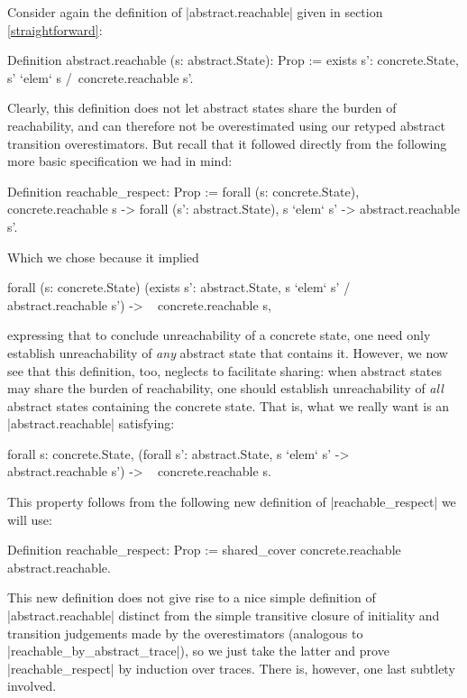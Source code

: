 \documentclass[runningheads]{llncs}
\begin{document}
Consider again the definition of |abstract.reachable| given in section \ref{straightforward}:
\begin{code}
Definition abstract.reachable (s: abstract.State): Prop
  := exists s': concrete.State, s' `elem` s /\ concrete.reachable s'.
\end{code}
Clearly, this definition does not let abstract states share the burden of reachability, and can therefore not be overestimated using our retyped abstract transition overestimators. But recall that it followed directly from the following more basic specification we had in mind:
\begin{code}
Definition reachable_respect: Prop :=
  forall (s: concrete.State), concrete.reachable s ->
    forall (s': abstract.State), s `elem` s' -> abstract.reachable s'.
\end{code}
Which we chose because it implied
\begin{code}
forall (s: concrete.State)
  (exists s': abstract.State, s `elem` s' /\ ~ abstract.reachable s') ->
    ~ concrete.reachable s,
\end{code}
expressing that to conclude unreachability of a concrete state, one need only establish unreachability of \emph{any} abstract state that contains it. However, we now see that this definition, too, neglects to facilitate sharing: when abstract states may share the burden of reachability, one should establish unreachability of \emph{all} abstract states containing the concrete state. That is, what we really want is an |abstract.reachable| satisfying:
\begin{code}
forall s: concrete.State,
  (forall s': abstract.State, s `elem` s' -> ~ abstract.reachable s') ->
  ~ concrete.reachable s.
\end{code}
This property follows from the following new definition of |reachable_respect| we will use:
\begin{code}
Definition reachable_respect: Prop :=
  shared_cover concrete.reachable abstract.reachable.
\end{code}
This new definition does not give rise to a nice simple definition of |abstract.reachable| distinct from the simple transitive closure of initiality and transition judgements made by the overestimators (analogous to |reachable_by_abstract_trace|), so we just take the latter and prove |reachable_respect| by induction over traces. There is, however, one last subtlety involved.
\end{document}

